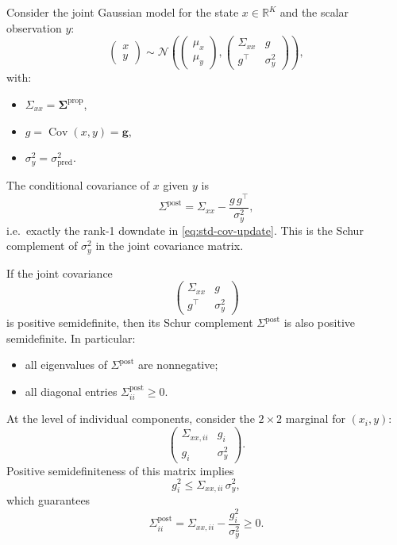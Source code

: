 \documentclass[11pt]{article}
\begin{document}
Consider the joint Gaussian model for the state \(x\in\mathbb{R}^K\) and the
scalar observation \(y\):
\[
\begin{pmatrix} x \\ y \end{pmatrix}
\sim
\mathcal{N}\!\left(
\begin{pmatrix}\mu_x \\ \mu_y\end{pmatrix},
\begin{pmatrix}
\Sigma_{xx} & g \\
g^\top      & \sigma_y^2
\end{pmatrix}
\right),
\]
with:
\begin{itemize}
  \item \(\Sigma_{xx} = \boldsymbol{\Sigma}^{\text{prop}}\),
  \item \(g = \operatorname{Cov}(x,y) = \mathbf{g}\),
  \item \(\sigma_y^2 = \sigma^2_{\text{pred}}\).
\end{itemize}

The conditional covariance of \(x\) given \(y\) is
\[
  \Sigma^{\text{post}}
  =
  \Sigma_{xx} - \frac{g\,g^\top}{\sigma_y^2},
\]
i.e.\ exactly the rank-1 downdate in \eqref{eq:std-cov-update}.  This is the
Schur complement of \(\sigma_y^2\) in the joint covariance matrix.

If the joint covariance
\[
  \begin{pmatrix}
  \Sigma_{xx} & g \\
  g^\top      & \sigma_y^2
  \end{pmatrix}
\]
is positive semidefinite, then its Schur complement \(\Sigma^{\text{post}}\)
is also positive semidefinite.  In particular:
\begin{itemize}
  \item all eigenvalues of \(\Sigma^{\text{post}}\) are nonnegative;
  \item all diagonal entries \(\Sigma^{\text{post}}_{ii} \ge 0\).
\end{itemize}

At the level of individual components, consider the \(2\times 2\) marginal for
\((x_i,y)\):
\[
  \begin{pmatrix}
  \Sigma_{xx,ii} & g_i \\
  g_i            & \sigma_y^2
  \end{pmatrix}.
\]
Positive semidefiniteness of this matrix implies
\[
  g_i^2 \le \Sigma_{xx,ii}\,\sigma_y^2,
\]
which guarantees
\[
  \Sigma^{\text{post}}_{ii}
  =
  \Sigma_{xx,ii} - \frac{g_i^2}{\sigma_y^2}
  \ge 0.
\]
\end{document}
